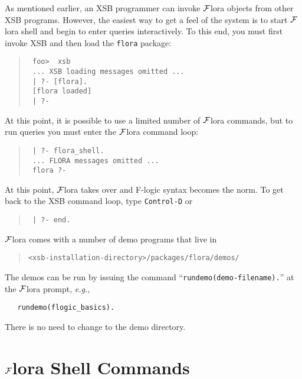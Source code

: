 \documentclass[11pt]{article}
\newcommand{\FLORA}{{\mbox{${\cal F}${\sc lora}}}\xspace}
\newcommand{\fl}{{F-logic}\xspace}
\begin{document}
As mentioned earlier, an XSB programmer can invoke \FLORA objects from
other XSB programs. However, the easiest way to get a feel of the system
is to start \FLORA shell and begin to enter queries interactively.  To
this end, you must first invoke XSB and then load the {\tt flora}
package:
\begin{quote}
  \tt
foo>~~xsb  \\
\tt
... XSB loading messages omitted ...\\
\tt
| ?- [flora].\\
\tt
[flora loaded]\\
\tt
| ?-
\end{quote}
At this point, it is possible to use a limited number of \FLORA
commands, but to run queries you must enter the \FLORA command loop:
\begin{quote}
  \tt
| ?- flora\_shell.  \\
 \tt
... FLORA messages omitted ... \\
 \tt
flora ?-
\end{quote}

At this point, \FLORA takes over and \fl syntax becomes the
norm. To get back to the XSB command loop, type {\tt Control-D} or 
\begin{quote}
  \tt
| ?- end.  
\end{quote}

\noindent
\FLORA comes with a number of demo programs that live in
\begin{quote}
 \verb|<xsb-installation-directory>/packages/flora/demos/|  
\end{quote}
The demos can be run by issuing the command
``\verb|rundemo(demo-filename).|''
at the \FLORA prompt, {\it e.g.},
\begin{verbatim}
   rundemo(flogic_basics). 
\end{verbatim}
There is no need to change to the demo directory.


\section{\FLORA Shell Commands} \label{sec-shell-commands}
\end{document}

